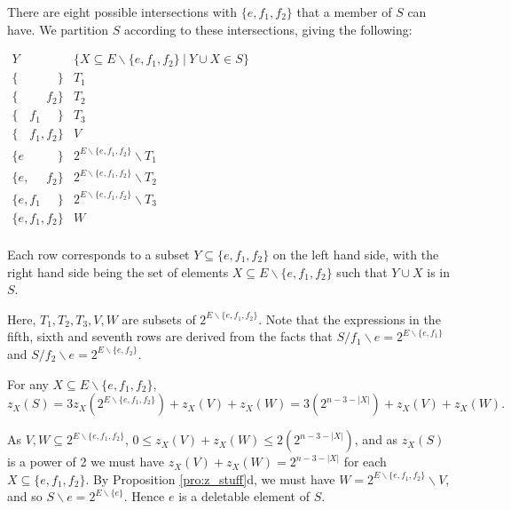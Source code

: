 \documentclass[10pt]{article}
\theoremstyle{definition}
\begin{document}
There are eight possible intersections with $\{e,f_1,f_2\}$ that a member of $S$ can have. We partition $S$ according to these intersections, giving the following:
 \begin{center}
 $
 	\begin{array} {c|c}
 	    Y       &     \{X\subseteq E\backslash\{e,f_1,f_2\}\ |\ Y\cup X \in S\}    \\\hline
 	\{\phantom{e}\phantom{,}\phantom{f_1}\phantom{,}\phantom{f_2}\} & T_1	\\
 	\{\phantom{e,}\phantom{f_1,}{f_2}\} & T_2   \\
 	\{\phantom{e,}{f_1}\phantom{,}\phantom{f_2}\} & T_3	\\	
 	\{\phantom{e,}{f_1,}{f_2}\}         & V\\	
 	\{{e}\phantom{,}\phantom{f_1}\phantom{,}\phantom{f_2}\}   & 2^{E\backslash\{e,f_1,f_2\}}\backslash T_1	\\
 	\{{e}{,}\phantom{f_1}\phantom{,}{f_2}\}         & 2^{E\backslash\{e,f_1,f_2\}}\backslash T_2	\\
 	\{{e}{,}{f_1}\phantom{,}\phantom{f_2}\}           & 2^{E\backslash\{e,f_1,f_2\}}\backslash T_3	\\
 	\{{e}{,}{f_1}{,}{f_2}\}                    & W	\\
 	\end{array}
 	$
\end{center}

Each row corresponds to a subset $Y\subseteq \{e,f_1,f_2\}$ on the left hand side, with the right hand side being the set of elements $X\subseteq E\backslash\{e,f_1,f_2\}$ such that $Y\cup X$ is in $S$.

Here, $T_1,T_2,T_3,V,W$ are subsets of $2^{E\backslash\{e,f_1,f_2\}}$. Note that the expressions in the fifth, sixth and seventh rows are derived from the facts that $S/f_1\backslash{e} = 2^{E\backslash{\{e,f_1\}}}$ and  $S/f_2\backslash{e} = 2^{E\backslash{\{e,f_2\}}}$.



 For any $X\subseteq  E\backslash \{e,f_1,f_2\}$,
 \[z_X(S)=3z_X(2^{E\backslash\{e,f_1,f_2\}})+z_X(V)+z_X(W)=3(2^{n-3-|X|})+z_X(V)+z_X(W).\]
 
  As $V,W\subseteq 2^{E\backslash\{e,f_1,f_2\}}$, $0\leq z_X(V)+z_X(W)\leq  2(2^{n-3-|X|})$, and as $z_X(S)$  is a power of 2 we must have $z_X(V)+z_X(W)=2^{n-3-|X|}$ for each $X\subseteq\{e,f_1,f_2\}$. By Proposition \ref{pro:z_stuff}{d}, we must have $W=2^{E\backslash\{e,f_1,f_2\}}\backslash V$, and so  $S\backslash e=2^{E\backslash\{e\}}$. Hence $e$ is a deletable element of $S$. 
  
\end{document}
